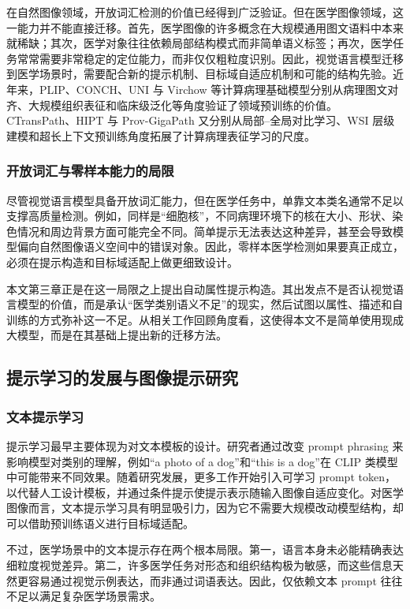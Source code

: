 在自然图像领域，开放词汇检测的价值已经得到广泛验证。但在医学图像领域，这一能力并不能直接迁移。首先，医学图像的许多概念在大规模通用图文语料中本来就稀缺；其次，医学对象往往依赖局部结构模式而非简单语义标签；再次，医学任务常常需要非常稳定的定位能力，而非仅仅粗粒度识别。因此，视觉语言模型迁移到医学场景时，需要配合新的提示机制、目标域自适应机制和可能的结构先验。近年来，PLIP、CONCH、UNI 与 Virchow 等计算病理基础模型分别从病理图文对齐、大规模组织表征和临床级泛化等角度验证了领域预训练的价值\cite{huang2023plip,lu2024conch,chen2024uni,vorontsov2024virchow}。CTransPath、HIPT 与 Prov-GigaPath 又分别从局部--全局对比学习、WSI 层级建模和超长上下文预训练角度拓展了计算病理表征学习的尺度\cite{wang2022ctranspath,chen2022hipt,xu2024gigapath}。

\subsubsection{开放词汇与零样本能力的局限}
尽管视觉语言模型具备开放词汇能力，但在医学任务中，单靠文本类名通常不足以支撑高质量检测。例如，同样是“细胞核”，不同病理环境下的核在大小、形状、染色情况和周边背景方面可能完全不同。简单提示无法表达这种差异，甚至会导致模型偏向自然图像语义空间中的错误对象。因此，零样本医学检测如果要真正成立，必须在提示构造和目标域适配上做更细致设计。

本文第三章正是在这一局限之上提出自动属性提示构造。其出发点不是否认视觉语言模型的价值，而是承认“医学类别语义不足”的现实，然后试图以属性、描述和自训练的方式弥补这一不足。从相关工作回顾角度看，这使得本文不是简单使用现成大模型，而是在其基础上提出新的迁移方法。

\subsection{提示学习的发展与图像提示研究}
\subsubsection{文本提示学习}
提示学习最早主要体现为对文本模板的设计。研究者通过改变 prompt phrasing 来影响模型对类别的理解，例如“a photo of a dog”和“this is a dog”在 CLIP 类模型中可能带来不同效果。随着研究发展，更多工作开始引入可学习 prompt token，以代替人工设计模板，并通过条件提示使提示表示随输入图像自适应变化\cite{zhou2022cocoop}。对医学图像而言，文本提示学习具有明显吸引力，因为它不需要大规模改动模型结构，却可以借助预训练语义进行目标域适配。

不过，医学场景中的文本提示存在两个根本局限。第一，语言本身未必能精确表达细粒度视觉差异。第二，许多医学任务对形态和组织结构极为敏感，而这些信息天然更容易通过视觉示例表达，而非通过词语表达。因此，仅依赖文本 prompt 往往不足以满足复杂医学场景需求。

